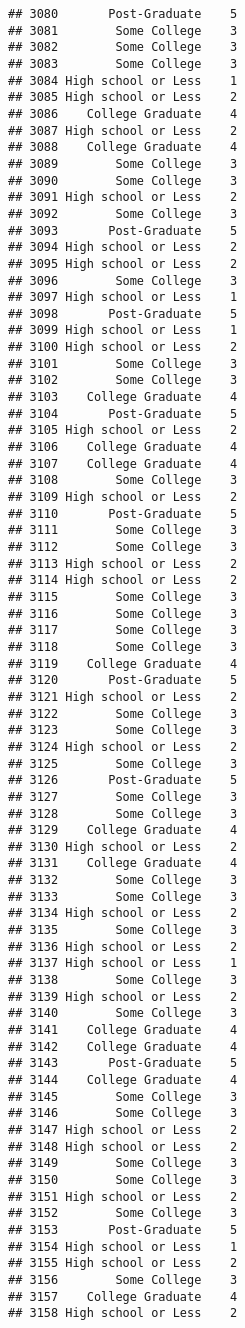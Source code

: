 \documentclass[
]{article}
\begin{document}
\begin{verbatim}
## 3080       Post-Graduate    5
## 3081        Some College    3
## 3082        Some College    3
## 3083        Some College    3
## 3084 High school or Less    1
## 3085 High school or Less    2
## 3086    College Graduate    4
## 3087 High school or Less    2
## 3088    College Graduate    4
## 3089        Some College    3
## 3090        Some College    3
## 3091 High school or Less    2
## 3092        Some College    3
## 3093       Post-Graduate    5
## 3094 High school or Less    2
## 3095 High school or Less    2
## 3096        Some College    3
## 3097 High school or Less    1
## 3098       Post-Graduate    5
## 3099 High school or Less    1
## 3100 High school or Less    2
## 3101        Some College    3
## 3102        Some College    3
## 3103    College Graduate    4
## 3104       Post-Graduate    5
## 3105 High school or Less    2
## 3106    College Graduate    4
## 3107    College Graduate    4
## 3108        Some College    3
## 3109 High school or Less    2
## 3110       Post-Graduate    5
## 3111        Some College    3
## 3112        Some College    3
## 3113 High school or Less    2
## 3114 High school or Less    2
## 3115        Some College    3
## 3116        Some College    3
## 3117        Some College    3
## 3118        Some College    3
## 3119    College Graduate    4
## 3120       Post-Graduate    5
## 3121 High school or Less    2
## 3122        Some College    3
## 3123        Some College    3
## 3124 High school or Less    2
## 3125        Some College    3
## 3126       Post-Graduate    5
## 3127        Some College    3
## 3128        Some College    3
## 3129    College Graduate    4
## 3130 High school or Less    2
## 3131    College Graduate    4
## 3132        Some College    3
## 3133        Some College    3
## 3134 High school or Less    2
## 3135        Some College    3
## 3136 High school or Less    2
## 3137 High school or Less    1
## 3138        Some College    3
## 3139 High school or Less    2
## 3140        Some College    3
## 3141    College Graduate    4
## 3142    College Graduate    4
## 3143       Post-Graduate    5
## 3144    College Graduate    4
## 3145        Some College    3
## 3146        Some College    3
## 3147 High school or Less    2
## 3148 High school or Less    2
## 3149        Some College    3
## 3150        Some College    3
## 3151 High school or Less    2
## 3152        Some College    3
## 3153       Post-Graduate    5
## 3154 High school or Less    1
## 3155 High school or Less    2
## 3156        Some College    3
## 3157    College Graduate    4
## 3158 High school or Less    2

\end{verbatim}
\end{document}
